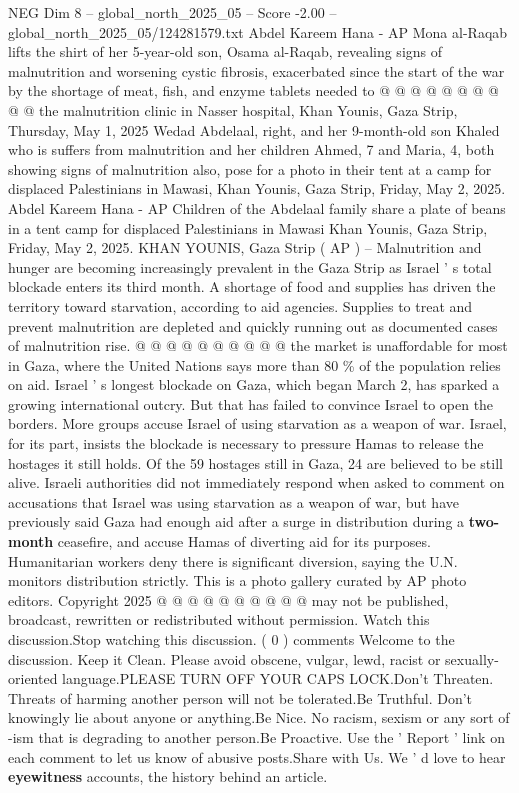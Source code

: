 \begin{textsample}{NEG Dim 8 – global\_north\_2025\_05 – Score -2.00 – global\_north\_2025\_05/124281579.txt}
Abdel Kareem Hana - AP Mona al-Raqab lifts the shirt of her 5-year-old son, Osama al-Raqab, revealing signs of malnutrition and worsening cystic fibrosis, exacerbated since the start of the war by the shortage of meat, fish, and enzyme tablets needed to @ @ @ @ @ @ @ @ @ @ the malnutrition clinic in Nasser hospital, Khan Younis, Gaza Strip, Thursday, May 1, 2025 Wedad Abdelaal, right, and her 9-month-old son Khaled who is suffers from malnutrition and her children Ahmed, 7 and Maria, 4, both showing signs of malnutrition also, pose for a photo in their tent at a camp for displaced Palestinians in Mawasi, Khan Younis, Gaza Strip, Friday, May 2, 2025.
Abdel Kareem Hana - AP Children of the Abdelaal family share a plate of beans in a tent camp for displaced Palestinians in Mawasi Khan Younis, Gaza Strip, Friday, May 2, 2025.
KHAN YOUNIS, Gaza Strip ( AP ) -- Malnutrition and hunger are becoming increasingly prevalent in the Gaza Strip as Israel ' s total blockade enters its third month.
A shortage of food and supplies has driven the territory toward starvation, according to aid agencies.
Supplies to treat and prevent malnutrition are depleted and quickly running out as documented cases of malnutrition rise. @ @ @ @ @ @ @ @ @ @ the market is unaffordable for most in Gaza, where the United Nations says more than 80 \% of the population relies on aid.
Israel ' s longest blockade on Gaza, which began March 2, has sparked a growing international outcry.
But that has failed to convince Israel to open the borders.
More groups accuse Israel of using starvation as a weapon of war.
Israel, for its part, insists the blockade is necessary to pressure Hamas to release the hostages it still holds.
Of the 59 hostages still in Gaza, 24 are believed to be still alive.
Israeli authorities did not immediately respond when asked to comment on accusations that Israel was using starvation as a weapon of war, but have previously said Gaza had enough aid after a surge in distribution during a \textbf{two-month} ceasefire, and accuse Hamas of diverting aid for its purposes.
Humanitarian workers deny there is significant diversion, saying the U.N. monitors distribution strictly.
This is a photo gallery curated by AP photo editors.
Copyright 2025 @ @ @ @ @ @ @ @ @ @ may not be published, broadcast, rewritten or redistributed without permission.
Watch this discussion.Stop watching this discussion. ( 0 ) comments Welcome to the discussion.
Keep it Clean.
Please avoid obscene, vulgar, lewd, racist or sexually-oriented language.PLEASE TURN OFF YOUR CAPS LOCK.Don't Threaten.
Threats of harming another person will not be tolerated.Be Truthful.
Don't knowingly lie about anyone or anything.Be Nice.
No racism, sexism or any sort of -ism that is degrading to another person.Be Proactive.
Use the ' Report ' link on each comment to let us know of abusive posts.Share with Us.
We ' d love to hear \textbf{eyewitness} accounts, the history behind an article.

\end{textsample}
